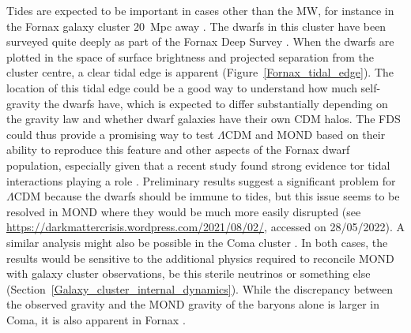 \documentclass[fleqn,usenatbib,useAMS,onecolumn]{mnras} %
\begin{document}
Tides are expected to be important in cases other than the MW, for instance in the Fornax galaxy cluster 20~Mpc away \citep{Jordan_2007}. The dwarfs in this cluster have been surveyed quite deeply as part of the Fornax Deep Survey \citep[FDS;][]{Venhola_2018}. When the dwarfs are plotted in the space of surface brightness and projected separation from the cluster centre, a clear tidal edge is apparent (Figure~\ref{Fornax_tidal_edge}). The location of this tidal edge could be a good way to understand how much self-gravity the dwarfs have, which is expected to differ substantially depending on the gravity law and whether dwarf galaxies have their own CDM halos. The FDS could thus provide a promising way to test $\Lambda$CDM and MOND based on their ability to reproduce this feature and other aspects of the Fornax dwarf population, especially given that a recent study found strong evidence tor tidal interactions playing a role \citep[see section 7.4 of][]{Venhola_2022}. Preliminary results suggest a significant problem for $\Lambda$CDM because the dwarfs should be immune to tides, but this issue seems to be resolved in MOND where they would be much more easily disrupted (see \href{https://darkmattercrisis.wordpress.com/2021/08/02/}{https://darkmattercrisis.wordpress.com/2021/08/02/}, accessed on 28/05/2022). A similar analysis might also be possible in the Coma cluster \citep{Chilingarian_2019, Freundlich_2021}. In both cases, the results would be sensitive to the additional physics required to reconcile MOND with galaxy cluster observations, be this sterile neutrinos or something else (Section~\ref{Galaxy_cluster_internal_dynamics}). While the discrepancy between the observed gravity and the MOND gravity of the baryons alone is larger in Coma, it is also apparent in Fornax \citep{Samurovic_2016_Fornax}.
\end{document}
